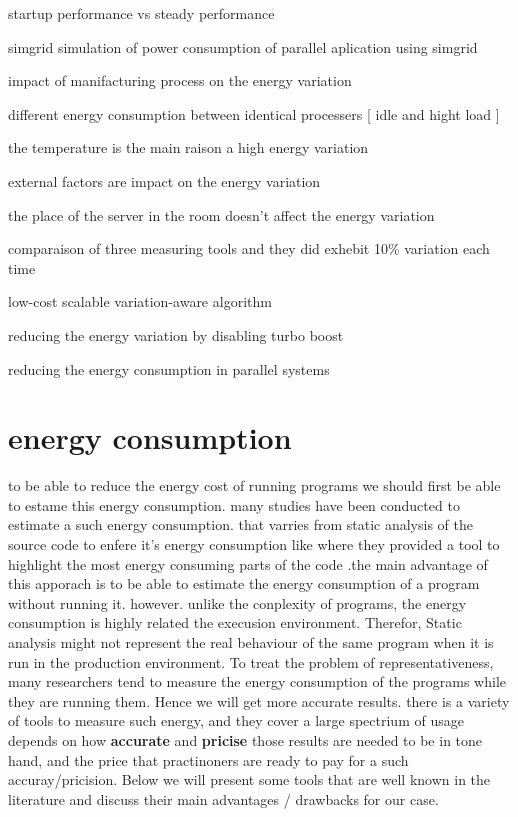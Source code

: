 startup performance vs steady performance \cite{buytaert_statistically_nodate}



simgrid simulation of power consumption of parallel aplication using simgrid \cite{heinrich2017predicting}

impact of manifacturing process on the energy variation \cite{coles2014comparing}

different energy consumption between identical processers [ idle and hight load ]\cite{von2016variations}

the temperature is the main raison a high energy variation \cite{wang2018potential}

external factors are impact on the energy variation \cite{mukherjee2009spatio}

the place of the server in the room doesn't affect the energy variation \cite{diouri2013your}

comparaison of three measuring tools and they did exhebit 10\% variation each time \cite{inadomi2015analyzing}

low-cost scalable variation-aware algorithm \cite{inadomi2015analyzing}

reducing the energy variation by disabling turbo boost \cite{acun2016variation}

reducing the energy consumption in parallel systems \cite{chasapis2016runtime}

\cite{marathe2017empirical}


\section{energy consumption}

to be able to reduce the energy cost of running programs we should first be able to estame this energy consumption.
many studies have been conducted to estimate a such energy consumption. that varries from static analysis of the source code to enfere it's energy consumption like \citeauthor{pereira_helping_2017} where they provided a tool to highlight the most energy consuming parts of the code \cite{pereira_helping_2017}.the main advantage of this apporach is to be able to estimate the energy consumption of a program without running it. however. unlike the conplexity of programs, the energy consumption is highly related the execusion environment. Therefor, Static analysis might not represent the real behaviour of the same program when it is run in the production environment.
To treat the problem of representativeness, many researchers tend to measure the energy consumption of the programs while they are running them. Hence we will get more accurate results.
there is a variety of tools to measure such energy, and they cover a large spectrium of usage depends on how \textbf{accurate} and \textbf{pricise} those results are needed to be in tone hand, and the price that practinoners are ready to pay for a such accuray/pricision.
Below we will present some tools that are well known in the literature and discuss their main advantages / drawbacks for our case.
